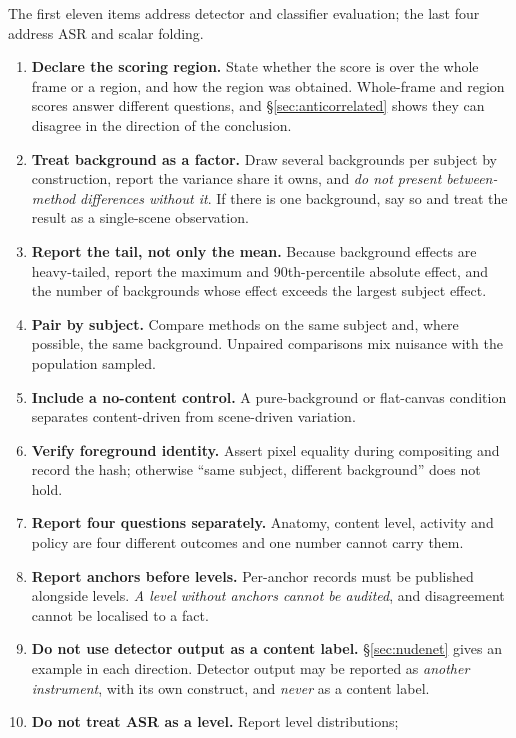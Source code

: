 \documentclass[11pt]{article}
\begin{document}
The first eleven items address detector and classifier evaluation; the last
four address ASR and scalar folding.

\begin{enumerate}
  \item \textbf{Declare the scoring region.} State whether the score is over
  the whole frame or a region, and how the region was obtained. Whole-frame and
  region scores answer different questions, and \S\ref{sec:anticorrelated}
  shows they can disagree in the direction of the conclusion.
  \item \textbf{Treat background as a factor.} Draw several backgrounds per
  subject by construction, report the variance share it owns, and \emph{do not
  present between-method differences without it}. If there is one background,
  say so and treat the result as a single-scene observation.
  \item \textbf{Report the tail, not only the mean.} Because background effects
  are heavy-tailed, report the maximum and 90th-percentile absolute effect, and
  the number of backgrounds whose effect exceeds the largest subject effect.
  \item \textbf{Pair by subject.} Compare methods on the same subject and,
  where possible, the same background. Unpaired comparisons mix nuisance with
  the population sampled.
  \item \textbf{Include a no-content control.} A pure-background or flat-canvas
  condition separates content-driven from scene-driven variation.
  \item \textbf{Verify foreground identity.} Assert pixel equality during
  compositing and record the hash; otherwise ``same subject, different
  background'' does not hold.
  \item \textbf{Report four questions separately.} Anatomy, content level,
  activity and policy are four different outcomes and one number cannot carry
  them.
  \item \textbf{Report anchors before levels.} Per-anchor records must be
  published alongside levels. \emph{A level without anchors cannot be audited},
  and disagreement cannot be localised to a fact.
  \item \textbf{Do not use detector output as a content label.}
  \S\ref{sec:nudenet} gives an example in each direction. Detector output may
  be reported as \emph{another instrument}, with its own construct, and
  \emph{never} as a content label.
  \item \textbf{Do not treat ASR as a level.} Report level distributions;

\end{enumerate}
\end{document}
